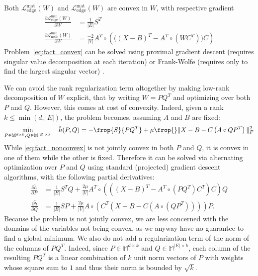 Both $\mathcal{L}_{\mathrm{edge}}^{\mathrm{mat}}(W)$ and
$\mathcal{L}_{\mathrm{edge}}^{\mathrm{mat}}(W)$ are convex in $W$, with respective gradient
\begin{align*}
  \frac{\partial \mathcal{L}_{\mathrm{edge}}^{\mathrm{mat}}(W)}{\partial W} &=
  \frac{1}{|E|} S^T \\
  \frac{\partial \mathcal{L}_{\mathrm{node}}^{\mathrm{mat}}(W)}{\partial W} &= \frac{-2}{|V|}
  A^T \circ \left(\Big(\left(X-B\right)^T -A^T \circ \left(W C^T\right) \Big) C\right)
\end{align*}
Problem~\eqref{eq:fact_convex} can be solved using proximal gradient descent (requires singular
value decomposition at each iteration) \autocite{Parikh2013a} or Frank-Wolfe (requires only to find
the largest singular vector) \autocite{Jaggi2013a}.
\fi

We can avoid the rank regularization term altogether by making low-rank decomposition of $W$
explicit, that by writing $W=PQ^T$ and optimizing over both $P$ and $Q$. However, this comes at cost
of convexity. Indeed, given a rank $k\leq \min(d,|E|)$, the problem becomes, assuming $A$ and $B$
are fixed:
\begin{equation}
  \label{eq:edge_PQ}
  \min_{P\in\mathbb{M}^{d\times k}, Q\in\mathbb{M}^{|E|\times k}} \quad \tilde{h}(P, Q) =
  - \frop{S}{PQ^T} + \mu \frop{} \|X - B - C\left(A\circ QP^T \right)\|_F^2
\end{equation}
While \eqref{eq:fact_nonconvex} is not jointly convex in both $P$ and $Q$, it is convex in one of
them while the other is fixed. Therefore it can be solved via alternating optimization over $P$ and
$Q$ using standard (projected) gradient descent algorithms, with the following partial derivatives:
\begin{align*}
  \frac{\partial \tilde{h}}{\partial P} &=
  \frac{1}{|E|} S^T Q + \frac{2\mu}{|V|}
  A^T \circ (((X-B)^T -A^T \circ (PQ^T )C^T )C)Q 
  \\
  \frac{\partial \tilde{h}}{\partial Q} &=
  \frac{1}{|E|} S P + \frac{2\mu}{|V|}
  A\circ (C^T (X-B-C(A\circ (QP^T ))))P.
\end{align*}
Because the problem is not jointly convex, we are less concerned with the domains of the variables
not being convex, as we anyway have no guarantee to find a global minimum. We also do not add a
regularization term of the norm of the columns of $PQ^T$. Indeed, since $P\in\mathbb{M}^{d\times k}$
and $Q\in\mathbb{M}^{|E|\times k}$, each column of the resulting $PQ^T$ is a linear combination of
$k$ unit norm vectors of $P$ with weights whose square sum to $1$ and thus their norm is bounded by
$\sqrt{k}$.

